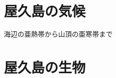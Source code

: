 \documentclass[10pt,titlepage,a5paper]{ltjsbook}
\begin{document}
  \chapter{屋久島の気候}
  
  \begin{savequote}
    海辺の亜熱帯から山頂の亜寒帯まで
  \end{savequote}
  \chapter{屋久島の生物}
  
\end{document}
